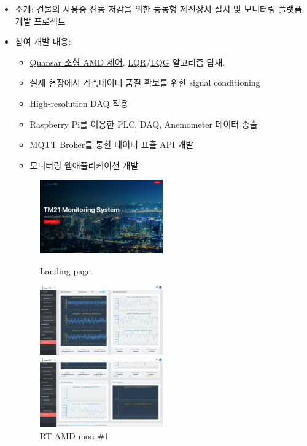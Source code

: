 \begin{itemize}
	\item 소개: 건물의 사용중 진동 저감을 위한 능동형 제진장치 설치 및 모니터링 플랫폼 개발 프로젝트
	\item 참여 개발 내용:
	      \begin{itemize}
		      \item \href{http://www.quanser.com/products/active_mass_damper}{Quansar 소형 AMD 제어}, \href{https://en.wikipedia.org/wiki/Linear-quadratic_regulator}{LQR}/\href{https://en.wikipedia.org/wiki/Linear-quadratic-Gaussian_control}{LQG} 알고리즘 탑재.
		      \item 실제 현장에서 계측데이터 품질 확보를 위한 signal conditioning
		      \item High-resolution DAQ 적용
		      \item Raspberry Pi를 이용한 PLC, DAQ, Anemometer 데이터 송출
		      \item MQTT Broker를 통한 데이터 표출 API 개발
		      \item 모니터링 웹애플리케이션 개발
	      \end{itemize}
	      \begin{figure}[!ht]
		      \begin{fullwidth}
			      \parbox{0.5\textwidth}{
				      \centering
				      \includegraphics[width=0.5\textwidth]{images/TM21 Vibration Controller Monitroing - landing.png}
				      \caption*{Landing page}
			      }\qquad
			      \parbox{0.5\textwidth}{
				      \centering
				      \includegraphics[width=0.5\textwidth]{images/TM21 Vibration Controller Monitroing - amd1}
				      \caption*{RT AMD mon \#1}
			      }\qquad
			      \parbox{0.5\textwidth}{
				      \centering
				      \includegraphics[width=0.5\textwidth]{images/TM21 Vibration Controller Monitroing - amd2}
}
\end{fullwidth}
\end{figure}
\end{itemize}
